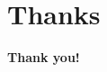\documentclass[xcolor={dvipsnames},aspectratio=169]{beamer}
\begin{document}
\section*{Thanks}

\begin{frame}
    \vspace*{1cm}
    \begin{center}
      {\Huge \bf \textcolor{mAlert}{Thank you!}} \\
      \bigskip
      \bigskip
    \end{center}
\end{frame}
\end{document}
